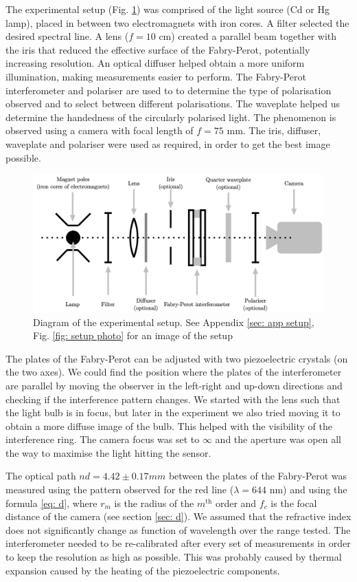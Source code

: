 \documentclass[11pt]{article}
\begin{document}
The experimental setup (Fig. \ref{fig: setup}) was comprised of the light source (Cd or Hg lamp), placed in between two electromagnets with iron cores. A filter selected the desired spectral line. A lens ($f = 10$ \si{cm}) created a parallel beam together with the iris that reduced the effective surface of the Fabry-Perot, potentially increasing resolution. An optical diffuser helped obtain a more uniform illumination, making measurements easier to perform. The Fabry-Perot interferometer and polariser are used to to determine the type of polarisation observed and to select between different polarisations. The waveplate helped us determine the handedness of the circularly polarised light. The phenomenon is observed using a camera with focal length of $f = 75$ \si{mm}. The iris, diffuser, waveplate and polariser were used as required, in order to get the best image possible. 

\begin{figure}
    \centering
    \includegraphics[width=0.65\linewidth]{setup.png}
    \captionsetup{justification=centering}
    \caption{Diagram of the experimental setup. See Appendix \ref{sec: app setup}, Fig. \ref{fig: setup photo} for an image of the setup}
    \label{fig: setup}    
\end{figure}
The plates of the Fabry-Perot can be adjusted with two piezoelectric crystals (on the two axes). We could find the position where the plates of the interferometer are parallel by moving the observer in the left-right and up-down directions and checking if the interference pattern changes. We started with the lens such that the light bulb is in focus, but later in the experiment we also tried moving it to obtain a more diffuse image of the bulb. This helped with the visibility of the interference ring. The camera focus was set to $\infty$ and the aperture was open all the way to maximise the light hitting the sensor. 

The optical path $nd = 4.42 \pm 0.17 \si{mm}$ between the plates of the Fabry-Perot was measured using the pattern observed for the red line ($\lambda = 644$ nm) and using the formula \eqref{eq: d}, where $r_m$ is the radius of the $m^{\text{th}}$ order and $f_c$ is the focal distance of the camera (see section \ref{sec: d}). We assumed that the refractive index does not significantly change as function of wavelength over the range tested. The interferometer needed to be re-calibrated after every set of measurements in order to keep the resolution as high as possible. This was probably caused by thermal expansion caused by the heating of the piezoelectric components. 
\end{document}
